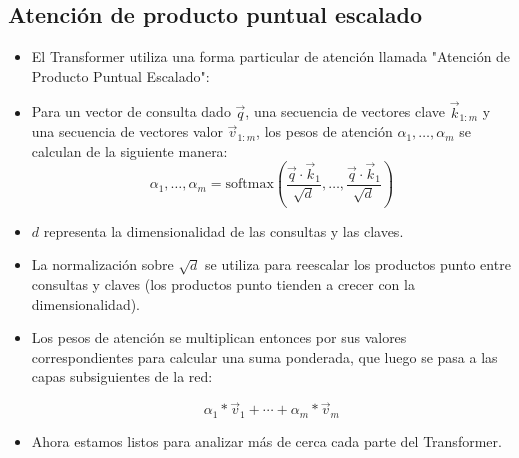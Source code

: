 \subsection{Atención de producto puntual escalado}
\begin{itemize}
\item El Transformer utiliza una forma particular de atención llamada "Atención de Producto Puntual Escalado":

\item Para un vector de consulta dado $\vec{q}$, una secuencia de vectores clave $\vec{k}_{1:m}$ y una secuencia de vectores valor $\vec{v}_{1:m}$, los pesos de atención $\alpha_1,\dots,\alpha_m$ se calculan de la siguiente manera:
\begin{displaymath}
\alpha_1,\dots,\alpha_m = \text{softmax}\left(\frac{\vec{q} \cdot \vec{k}_{1}}{\sqrt{d}}, \dots,\frac{\vec{q} \cdot \vec{k}_{1}}{\sqrt{d}}\right)
\end{displaymath}
\item $d$ representa la dimensionalidad de las consultas y las claves.

\item La normalización sobre $\sqrt{d}$ se utiliza para reescalar los productos punto entre consultas y claves (los productos punto tienden a crecer con la dimensionalidad).

\item Los pesos de atención se multiplican entonces por sus valores correspondientes para calcular una suma ponderada, que luego se pasa a las capas subsiguientes de la red:

\begin{displaymath}
\alpha_1*\vec{v}_1+\cdots+\alpha_m*\vec{v}_m
\end{displaymath}

\item Ahora estamos listos para analizar más de cerca cada parte del Transformer.

\end{itemize}

